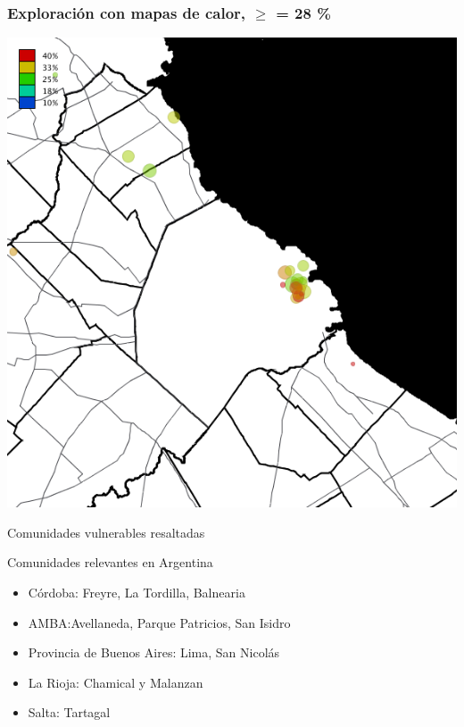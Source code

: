 \documentclass[xcolor=x11names]{beamer}
\begin{document}
\begin{frame}
	\frametitle{Exploración con mapas de calor, $\geq$ = 28 \%}
	\centering
	\includegraphics[height=.9\textheight,width = .9\columnwidth,keepaspectratio]
	{slides/201112_hi_res_amba_usuarios_proporcion_circulos_beta28.png}
\end{frame}

\begin{frame}{Comunidades vulnerables resaltadas}


	\bigskip

	\begin{block}{Comunidades relevantes en Argentina}
		\begin{itemize}
			\item Córdoba: Freyre, La Tordilla, Balnearia
			\item AMBA:\@ Avellaneda, Parque Patricios, San Isidro
			\item Provincia de Buenos Aires: Lima, San Nicolás
			\item La Rioja: Chamical y Malanzan
			\item Salta: Tartagal
		\end{itemize}

	\end{block}
\end{frame}
\end{document}

